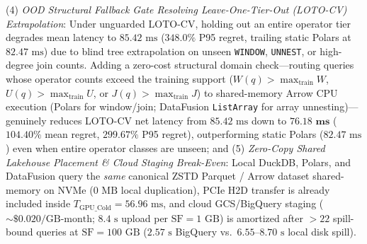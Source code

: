 \documentclass[10pt,a4paper]{article}
\begin{document}
(4) \emph{OOD Structural Fallback Gate Resolving Leave-One-Tier-Out (LOTO-CV) Extrapolation}: Under unguarded LOTO-CV, holding out an entire operator tier degrades mean latency to $85.42\text{ ms}$ ($348.0\%$ P95 regret, trailing static Polars at $82.47\text{ ms}$) due to blind tree extrapolation on unseen \texttt{WINDOW}, \texttt{UNNEST}, or high-degree join counts. Adding a zero-cost structural domain check---routing queries whose operator counts exceed the training support ($W(q) > \max_{\text{train}} W$, $U(q) > \max_{\text{train}} U$, or $J(q) > \max_{\text{train}} J$) to shared-memory Arrow CPU execution (Polars for window/join; DataFusion \texttt{ListArray} for array unnesting)---genuinely reduces LOTO-CV net latency from $85.42\text{ ms}$ down to $\mathbf{76.18\text{ ms}}$ ($104.40\%$ mean regret, $299.67\%$ P95 regret), outperforming static Polars ($82.47\text{ ms}$) even when entire operator classes are unseen; and
(5) \emph{Zero-Copy Shared Lakehouse Placement \& Cloud Staging Break-Even}: Local DuckDB, Polars, and DataFusion query the \emph{same} canonical ZSTD Parquet / Arrow dataset shared-memory on NVMe ($0\text{ MB}$ local duplication), PCIe H2D transfer is already included inside $T_{\text{GPU\_Cold}} = 56.96\text{ ms}$, and cloud GCS/BigQuery staging ($\sim\$0.020/\text{GB-month}$; $8.4\text{ s}$ upload per $\text{SF}=1\text{ GB}$) is amortized after $>22$ spill-bound queries at $\text{SF}=100\text{ GB}$ ($2.57\text{ s}$ BigQuery vs.\ $6.55\text{--}8.70\text{ s}$ local disk spill).
\end{document}
